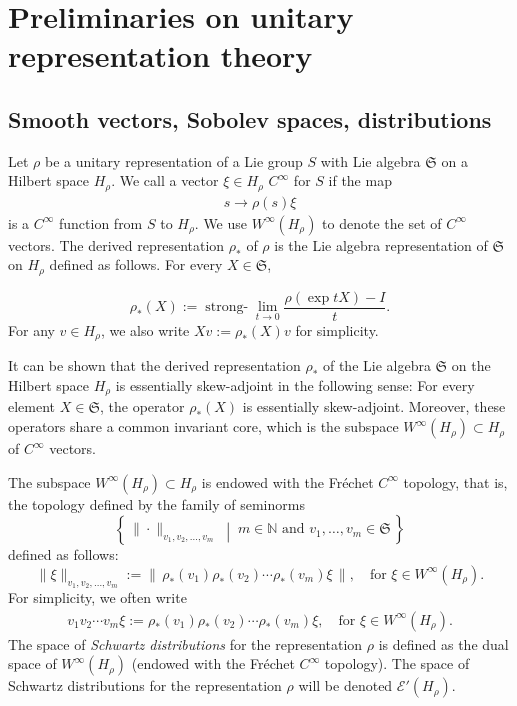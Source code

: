 \documentclass[11 pt]{amsart}
\theoremstyle{definition}
\numberwithin{equation}{section}
\begin{document}
\section{Preliminaries on unitary representation theory}\label{sec:9}
\subsection{Smooth vectors, Sobolev spaces, distributions}
Let $\rho$ be a unitary representation of a Lie group $S$ with Lie algebra $\mathfrak{S}$ on a Hilbert space $H_\rho$. We call a vector $\xi\in H_\rho$ $C^\infty$ for $S$ if the map
\begin{align*}
 s\to \rho(s)\xi
\end{align*}
is a $C^\infty$ function from $S$ to $H_\rho$. We use $W^\infty(H_\rho)$ to denote the set of $C^\infty$ vectors. The derived representation $\rho_*$ of $\rho$  is the Lie algebra representation of $\mathfrak{S}$ on $H_\rho$ defined as follows. For every $X \in \mathfrak{S}$,

\begin{equation}
\rho_*(X) := \operatorname{strong{-} }\lim_{t \to 0} \frac{\rho(\exp tX) - I}{t}.
\end{equation}
For any $v\in H_\rho$, we also write $Xv:=\rho_*(X)v$ for simplicity.



It can be shown that the derived representation $\rho_*$ of the Lie algebra $\mathfrak{S}$ on the Hilbert space $H_\rho$ is essentially skew-adjoint in the following sense: For every element $X \in \mathfrak{S}$, the operator $\rho_*(X)$ is essentially skew-adjoint. Moreover, these operators share a common invariant core, which is the subspace $W^\infty(H_\rho) \subset H_\rho$ of $C^\infty$ vectors.

The subspace $W^\infty(H_\rho)\subset H_\rho$ is endowed with the Fr\'{e}chet $C^\infty$ topology, that is, the topology defined by the family of seminorms
\[
\left\{\, \| \cdot \|_{v_1,v_2,\dots,v_m} \;\middle|\; m \in \mathbb{N} \text{ and } v_1, \ldots, v_m \in \mathfrak{S} \,\right\}
\]
defined as follows:
\[
\| \xi\|_{v_1,v_2,\dots,v_m} := \left\|\, \rho_*(v_1)\rho_*(v_2) \cdots \rho_*(v_m)\xi \,\right\|, \quad \text{for } \xi \in W^\infty(H_\rho) .
\]
For simplicity, we often write
\begin{align*}
 v_1v_2\cdots v_m\xi:=\rho_*(v_1)\rho_*(v_2) \cdots \rho_*(v_m)\xi, \quad \text{for } \xi \in W^\infty(H_\rho).
\end{align*}
The space of \emph{Schwartz distributions} for the representation $\rho$ is defined as the dual space of $W^\infty(H_\rho)$ (endowed with the Fr\'{e}chet $C^\infty$ topology). The space of Schwartz distributions for the representation $\rho$ will be denoted $\mathcal{E}'(H_\rho)$.
\end{document}
